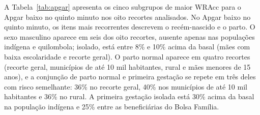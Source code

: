 A Tabela~\ref{tab:apgar} apresenta os cinco subgrupos de maior WRAcc para o Apgar baixo no quinto minuto nos oito recortes analisados.
No Apgar baixo no quinto minuto, os itens mais recorrentes descrevem o recém-nascido e o parto. O sexo masculino aparece em seis dos oito recortes, ausente apenas nas populações indígena e quilombola; isolado, está entre 8\% e 10\% acima da basal (mães com baixa escolaridade e recorte geral). O parto normal aparece em quatro recortes (recorte geral, municípios de até 10 mil habitantes, rural e mães menores de 15 anos), e a conjunção de parto normal e primeira gestação se repete em três deles com risco semelhante: 36\% no recorte geral, 40\% nos municípios de até 10 mil habitantes e 36\% no rural. A primeira gestação isolada está 30\% acima da basal na população indígena e 25\% entre as beneficiárias do Bolsa Família.


